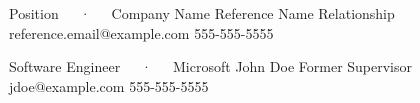 \newpage{}

\begin{cventries}

   \cventry
   {Position~~~·~~~Company Name} %
   {Reference Name} %
   {Relationship} %
   {reference.email@example.com} %
   {555-555-5555} %

   \cventry
   {Software Engineer~~~·~~~Microsoft} %
   {John Doe} %
   {Former Supervisor} %
   {jdoe@example.com} %
   {555-555-5555} %


\end{cventries}
